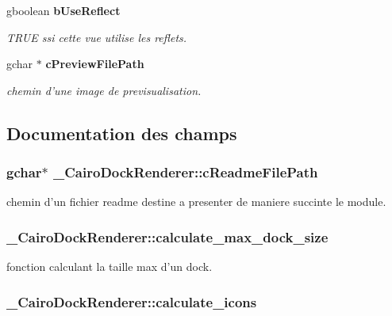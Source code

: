 \begin{CompactItemize}
gboolean {\bf b\-Use\-Reflect}
\begin{CompactList}\small\item\em TRUE ssi cette vue utilise les reflets. \item\end{CompactList}\item 
gchar $\ast$ {\bf c\-Preview\-File\-Path}
\begin{CompactList}\small\item\em chemin d'une image de previsualisation. \item\end{CompactList}\end{CompactItemize}


\subsection{Documentation des champs}
\subsubsection{\setlength{\rightskip}{0pt plus 5cm}gchar$\ast$ {\bf \_\-Cairo\-Dock\-Renderer::c\-Readme\-File\-Path}}\label{struct__CairoDockRenderer_5ab5db64bd5a20186af903be07d2e5e4}


chemin d'un fichier readme destine a presenter de maniere succinte le module. 

\subsubsection{ {\bf \_\-Cairo\-Dock\-Renderer::calculate\_\-max\_\-dock\_\-size}}\label{struct__CairoDockRenderer_32701b36d01c497f468a8d9d07a6655b}


fonction calculant la taille max d'un dock. 

\subsubsection{ {\bf \_\-Cairo\-Dock\-Renderer::calculate\_\-icons}}\label{struct__CairoDockRenderer_53aaac10d7fd62b4d05ff1198dfafbdb}


